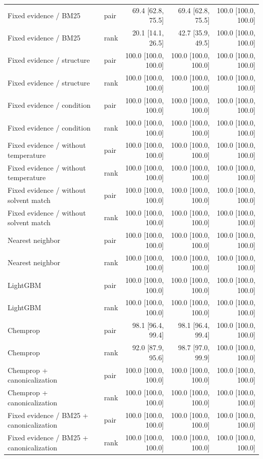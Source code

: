 \begin{longtable}{p{.26\linewidth}lrrr}
Fixed evidence / BM25 & pair & 69.4 [62.8, 75.5] & 69.4 [62.8, 75.5] & 100.0 [100.0, 100.0] \\
Fixed evidence / BM25 & rank & 20.1 [14.1, 26.5] & 42.7 [35.9, 49.5] & 100.0 [100.0, 100.0] \\
Fixed evidence / structure & pair & 100.0 [100.0, 100.0] & 100.0 [100.0, 100.0] & 100.0 [100.0, 100.0] \\
Fixed evidence / structure & rank & 100.0 [100.0, 100.0] & 100.0 [100.0, 100.0] & 100.0 [100.0, 100.0] \\
Fixed evidence / condition & pair & 100.0 [100.0, 100.0] & 100.0 [100.0, 100.0] & 100.0 [100.0, 100.0] \\
Fixed evidence / condition & rank & 100.0 [100.0, 100.0] & 100.0 [100.0, 100.0] & 100.0 [100.0, 100.0] \\
Fixed evidence / without temperature & pair & 100.0 [100.0, 100.0] & 100.0 [100.0, 100.0] & 100.0 [100.0, 100.0] \\
Fixed evidence / without temperature & rank & 100.0 [100.0, 100.0] & 100.0 [100.0, 100.0] & 100.0 [100.0, 100.0] \\
Fixed evidence / without solvent match & pair & 100.0 [100.0, 100.0] & 100.0 [100.0, 100.0] & 100.0 [100.0, 100.0] \\
Fixed evidence / without solvent match & rank & 100.0 [100.0, 100.0] & 100.0 [100.0, 100.0] & 100.0 [100.0, 100.0] \\
Nearest neighbor & pair & 100.0 [100.0, 100.0] & 100.0 [100.0, 100.0] & 100.0 [100.0, 100.0] \\
Nearest neighbor & rank & 100.0 [100.0, 100.0] & 100.0 [100.0, 100.0] & 100.0 [100.0, 100.0] \\
LightGBM & pair & 100.0 [100.0, 100.0] & 100.0 [100.0, 100.0] & 100.0 [100.0, 100.0] \\
LightGBM & rank & 100.0 [100.0, 100.0] & 100.0 [100.0, 100.0] & 100.0 [100.0, 100.0] \\
Chemprop & pair & 98.1 [96.4, 99.4] & 98.1 [96.4, 99.4] & 100.0 [100.0, 100.0] \\
Chemprop & rank & 92.0 [87.9, 95.6] & 98.7 [97.0, 99.9] & 100.0 [100.0, 100.0] \\
Chemprop + canonicalization & pair & 100.0 [100.0, 100.0] & 100.0 [100.0, 100.0] & 100.0 [100.0, 100.0] \\
Chemprop + canonicalization & rank & 100.0 [100.0, 100.0] & 100.0 [100.0, 100.0] & 100.0 [100.0, 100.0] \\
Fixed evidence / BM25 + canonicalization & pair & 100.0 [100.0, 100.0] & 100.0 [100.0, 100.0] & 100.0 [100.0, 100.0] \\
Fixed evidence / BM25 + canonicalization & rank & 100.0 [100.0, 100.0] & 100.0 [100.0, 100.0] & 100.0 [100.0, 100.0] \\
\bottomrule
\end{longtable}
\endgroup
